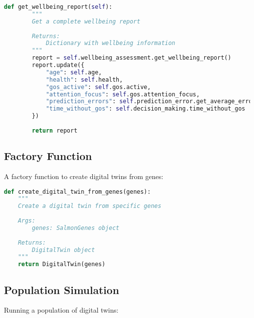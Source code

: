 \documentclass[11pt,a4paper]{article}
\begin{document}
\begin{lstlisting}[language=Python]
    def get_wellbeing_report(self):
        """
        Get a complete wellbeing report
        
        Returns:
            Dictionary with wellbeing information
        """
        report = self.wellbeing_assessment.get_wellbeing_report()
        report.update({
            "age": self.age,
            "health": self.health,
            "gos_active": self.gos.active,
            "attention_focus": self.gos.attention_focus,
            "prediction_errors": self.prediction_error.get_average_error(),
            "time_without_gos": self.decision_making.time_without_gos
        })
        
        return report
\end{lstlisting}

\subsection{Factory Function}
A factory function to create digital twins from genes:

\begin{lstlisting}[language=Python]
def create_digital_twin_from_genes(genes):
    """
    Create a digital twin from specific genes
    
    Args:
        genes: SalmonGenes object
        
    Returns:
        DigitalTwin object
    """
    return DigitalTwin(genes)
\end{lstlisting}

\subsection{Population Simulation}
Running a population of digital twins:
\end{document}
